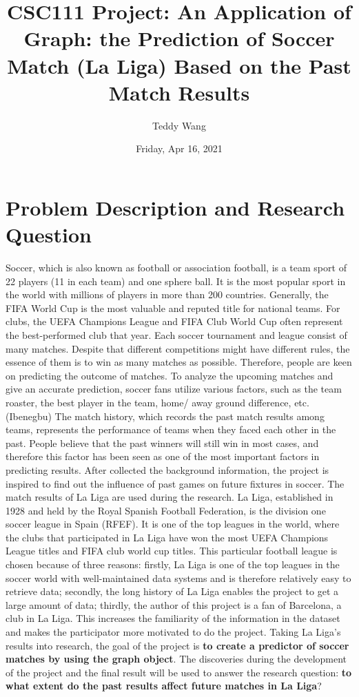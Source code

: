 \documentclass[fontsize=11pt]{article}
\title{CSC111 Project: An Application of Graph: the Prediction of Soccer Match (La Liga) Based on the Past Match Results}
\author{Teddy Wang}
\date{Friday, Apr 16, 2021}
\begin{document}
\maketitle

\section*{Problem Description and Research Question}

Soccer, which is also known as football or association football, is a team sport of 22 players (11 in each team) and one sphere ball. It is the most popular sport in the world with millions of players in more than 200 countries. Generally, the FIFA World Cup is the most valuable and reputed title for national teams. For clubs, the UEFA Champions League and FIFA Club World Cup often represent the best-performed club that year. 
\newline
\newline
Each soccer tournament and league consist of many matches. Despite that different competitions might have different rules, the essence of them is to win as many matches as possible. Therefore, people are keen on predicting the outcome of matches. To analyze the upcoming matches and give an accurate prediction, soccer fans utilize various factors, such as the team roaster, the best player in the team, home/ away ground difference, etc. (Ibenegbu) The match history, which records the past match results among teams, represents the performance of teams when they faced each other in the past. People believe that the past winners will still win in most cases, and therefore this factor has been seen as one of the most important factors in predicting results. After collected the background information, the project is inspired to find out the influence of past games on future fixtures in soccer.
\newline
\newline
The match results of La Liga are used during the research. La Liga, established in 1928 and held by the Royal Spanish Football Federation, is the division one soccer league in Spain (RFEF). It is one of the top leagues in the world, where the clubs that participated in La Liga have won the most UEFA Champions League titles and FIFA club world cup titles. This particular football league is chosen because of three reasons: firstly, La Liga is one of the top leagues in the soccer world with well-maintained data systems and is therefore relatively easy to retrieve data; secondly, the long history of La Liga enables the project to get a large amount of data; thirdly, the author of this project is a fan of Barcelona, a club in La Liga. This increases the familiarity of the information in the dataset and makes the participator more motivated to do the project. 
\newline
\newline
Taking La Liga's results into research, the goal of the project is \textbf{to create a predictor of soccer matches by using the graph object}. The discoveries during the development of the project and the final result will be used to answer the research question: \textbf{to what extent do the past results affect future matches in La Liga}?
\end{document}
